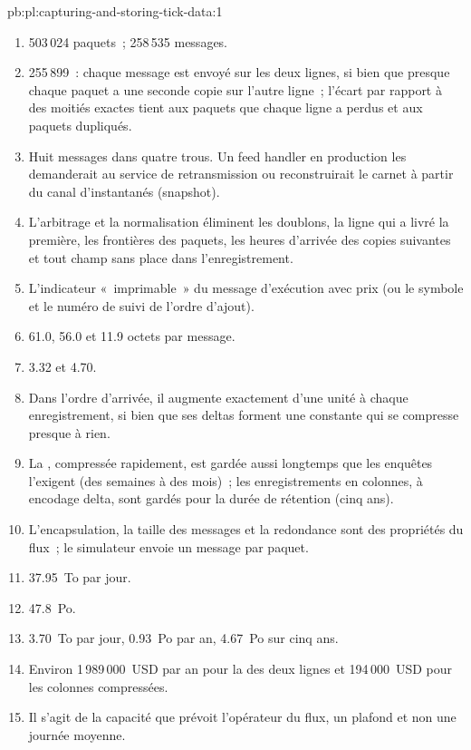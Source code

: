 \begin{solution}{pb:pl:capturing-and-storing-tick-data:1}
\begin{enumerate}
\item 503\,024 paquets~; 258\,535 messages.
\item 255\,899~: chaque message est envoyé sur les deux lignes, si bien que presque chaque paquet a une seconde copie sur l'autre ligne~; l'écart
par rapport à des moitiés exactes tient aux paquets que chaque ligne a perdus et aux paquets dupliqués.
\item Huit messages dans quatre trous. Un feed handler en production les demanderait au service de retransmission ou reconstruirait le carnet à partir
du canal d'instantanés (snapshot).
\item L'arbitrage et la normalisation éliminent les doublons, la ligne qui a livré la première, les frontières des paquets, les
heures d'arrivée des copies suivantes et tout champ sans place dans l'enregistrement.
\item L'indicateur «~imprimable~» du message d'exécution avec prix (ou le symbole et le numéro de suivi de l'ordre d'ajout).
\item 61.0, 56.0 et 11.9 octets par message.
\item 3.32 et 4.70.
\item Dans l'ordre d'arrivée, il augmente exactement d'une unité à chaque enregistrement, si bien que ses deltas forment une constante qui se compresse presque
à rien.
\item La , compressée rapidement, est gardée aussi longtemps que les enquêtes l'exigent (des semaines à des mois)~; les enregistrements en colonnes,
à encodage delta, sont gardés pour la durée de rétention (cinq ans).
\item L'encapsulation, la taille des messages et la redondance sont des propriétés du flux~; le simulateur envoie un message par paquet.
\item 37.95~To par jour.
\item 47.8~Po.
\item 3.70~To par jour, 0.93~Po par an, 4.67~Po sur cinq ans.
\item Environ 1\,989\,000~USD par an pour la  des deux lignes et 194\,000~USD pour les colonnes compressées.
\item Il s'agit de la capacité que prévoit l'opérateur du flux, un plafond et non une journée moyenne.

\end{enumerate}
\end{solution}
